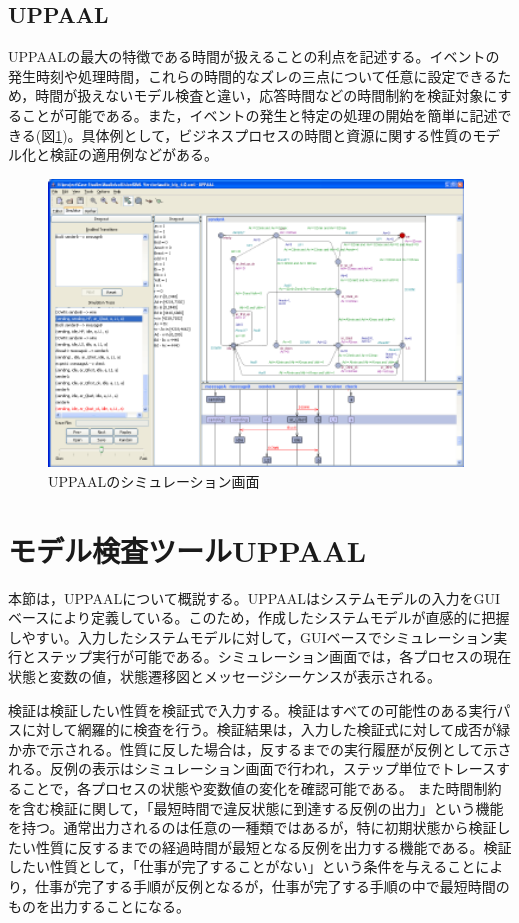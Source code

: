 \documentclass{tpu-sotu}
\begin{document}
	\subsection{UPPAAL}
	UPPAALの最大の特徴である時間が扱えることの利点を記述する。イベントの発生時刻や処理時間，これらの時間的なズレの三点について任意に設定できるため，時間が扱えないモデル検査と違い，応答時間などの時間制約を検証対象にすることが可能である。また，イベントの発生と特定の処理の開始を簡単に記述できる(図\ref{uppaal})。具体例として，ビジネスプロセスの時間と資源に関する性質のモデル化と検証の適用例などがある\cite{a9}。
	\begin{figure}[htbp]
	\centering
	\includegraphics[width=110mm]{uppaal.png}
	\caption{UPPAALのシミュレーション画面\cite{u2}}
	\label{uppaal}
	\end{figure}
	\section{モデル検査ツールUPPAAL}
	本節は，UPPAALについて概説する。UPPAALはシステムモデルの入力をGUIベースにより定義している。このため，作成したシステムモデルが直感的に把握しやすい。入力したシステムモデルに対して，GUIベースでシミュレーション実行とステップ実行が可能である。シミュレーション画面では，各プロセスの現在状態と変数の値，状態遷移図とメッセージシーケンスが表示される。
	
	検証は検証したい性質を検証式で入力する。検証はすべての可能性のある実行パスに対して網羅的に検査を行う。検証結果は，入力した検証式に対して成否が緑か赤で示される。性質に反した場合は，反するまでの実行履歴が反例として示される。反例の表示はシミュレーション画面で行われ，ステップ単位でトレースすることで，各プロセスの状態や変数値の変化を確認可能である。
	また時間制約を含む検証に関して，「最短時間で違反状態に到達する反例の出力」という機能を持つ。通常出力されるのは任意の一種類ではあるが，特に初期状態から検証したい性質に反するまでの経過時間が最短となる反例を出力する機能である。検証したい性質として，「仕事が完了することがない」という条件を与えることにより，仕事が完了する手順が反例となるが，仕事が完了する手順の中で最短時間のものを出力することになる。
\end{document}
